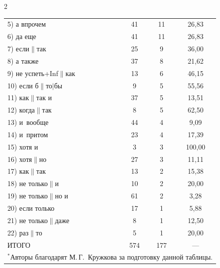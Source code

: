 \begin{multicols}{2}
\begin{enumerate}[(1)]
\begin{table}
\begin{center}
\begin{tabular}{|l|c|c|c|}
\hphantom{9}5) а впрочем&41&11\hphantom{9}&26,83\\


\hphantom{9}6) да еще&41&11\hphantom{9}&26,83\\


\hphantom{9}7) если$\|$так&25&9&36,00\\


\hphantom{9}8) а также&37&8&21,62\\


\hphantom{9}9) не успеть\;+\;Inf$\|$как&13&6&46,15\\


10) если б$\|$то$\vert$бы&\hphantom{9}9&5&55,56\\


11) как$\|$так и&37&5&13,51\\


12) когда$\|$так&\hphantom{9}8&5&62,50\\


13) и~вообще&44&4&\hphantom{9}9,09\\


14) и~притом&23&4&17,39\\


15) хотя и&\hphantom{9}3&3&100,00\hphantom{9}\\


16) хотя$\|$но&27&3&11,11\\


17) как$\|$так&13&2&15,38\\


18) не только$\|$и&10&2&20,00\\


19) не только$\|$но и&61&2&\hphantom{9}3,28\\


20) если только&17&1&\hphantom{9}5,88\\


21) не только$\|$даже&\hphantom{9}8&1&12,50\\


22) раз$\|$то&\hphantom{9}5&1&20,00\\


\hline


ИТОГО&574\hphantom{9}&177\hphantom{99}&---\\


\hline


\multicolumn{4}{l}{\footnotesize \hspace*{2mm}$^*$Авторы благодарят М.\,Г.~Кружкова за подготовку данной таблицы.}



\end{tabular}
\end{center}
\end{table}
\end{enumerate}
\end{multicols}
